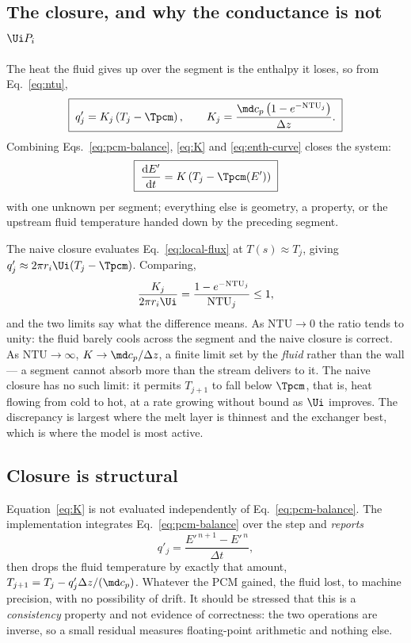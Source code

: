 \subsection{The closure, and why the conductance is not $\Ui P_{i}$}

The heat the fluid gives up over the segment is the enthalpy it loses, so from
Eq.~\eqref{eq:ntu},
\begin{equation}
  \boxed{\;
  q'_{j} = K_{j}\left(T_{j}-\Tpcm\right),
  \qquad
  K_{j} = \frac{\md c_{p}\left(1-e^{-\mathrm{NTU}_{j}}\right)}{\Delta z}.
  \;}
  \label{eq:K}
\end{equation}
Combining Eqs.~\eqref{eq:pcm-balance}, \eqref{eq:K} and \eqref{eq:enth-curve}
closes the system:
\begin{equation}
  \boxed{\;
  \frac{\mathrm{d}E'}{\mathrm{d}t}
  = K\left(T_{j}-\Tpcm(E')\right)
  \;}
  \label{eq:ode}
\end{equation}
with one unknown per segment; everything else is geometry, a property, or the
upstream fluid temperature handed down by the preceding segment.

The naive closure evaluates Eq.~\eqref{eq:local-flux} at $T(s)\approx T_{j}$,
giving $q'_{j}\approx 2\pi r_{i}\Ui(T_{j}-\Tpcm)$. Comparing,
\begin{equation}
  \frac{K_{j}}{2\pi r_{i}\Ui}
  = \frac{1-e^{-\mathrm{NTU}_{j}}}{\mathrm{NTU}_{j}} \le 1,
  \label{eq:K-ratio}
\end{equation}
and the two limits say what the difference means. As $\mathrm{NTU}\to0$ the
ratio tends to unity: the fluid barely cools across the segment and the naive
closure is correct. As $\mathrm{NTU}\to\infty$, $K\to\md c_{p}/\Delta z$, a
finite limit set by the \emph{fluid} rather than the wall --- a segment cannot
absorb more than the stream delivers to it. The naive closure has no such limit:
it permits $T_{j+1}$ to fall below $\Tpcm$, that is, heat flowing from cold to
hot, at a rate growing without bound as $\Ui$ improves. The discrepancy is
largest where the melt layer is thinnest and the exchanger best, which is where
the model is most active.

\subsection{Closure is structural}

Equation~\eqref{eq:K} is not evaluated independently of
Eq.~\eqref{eq:pcm-balance}. The implementation integrates
Eq.~\eqref{eq:pcm-balance} over the step and \emph{reports}
\begin{equation}
  q'_{j} = \frac{E'^{\,n+1}-E'^{\,n}}{\Delta t},
  \label{eq:qfromE}
\end{equation}
then drops the fluid temperature by exactly that amount,
$T_{j+1}=T_{j}-q'_{j}\Delta z/(\md c_{p})$. Whatever the PCM gained, the fluid
lost, to machine precision, with no possibility of drift. It should be stressed
that this is a \emph{consistency} property and not evidence of correctness: the
two operations are inverse, so a small residual measures floating-point
arithmetic and nothing else.

